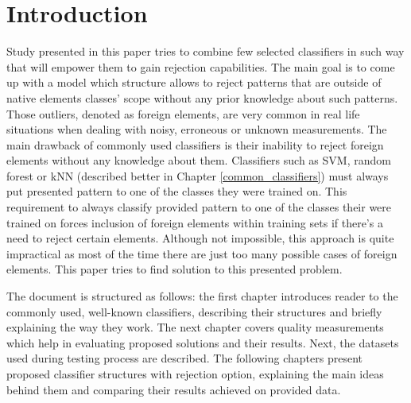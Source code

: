 \chapter{Introduction}

Study presented in this paper tries to combine few selected classifiers in such way that will empower them to gain rejection capabilities. The main goal is to come up with a model which structure allows to reject patterns that are outside of native elements classes' scope without any prior knowledge about such patterns. Those outliers, denoted as foreign elements, are very common in real life situations when dealing with noisy, erroneous or unknown measurements. The main drawback of commonly used classifiers is their inability to reject foreign elements without any knowledge about them. Classifiers such as SVM, random forest or kNN (described better in Chapter \ref{common_classifiers}) must always put presented pattern to one of the classes they were trained on. This  requirement to always classify provided pattern to one of the classes their were trained on forces inclusion of foreign elements within training sets if there's a need to reject certain elements. Although not impossible, this approach is quite impractical as most of the time there are just too many possible cases of foreign elements. This paper tries to find solution to this presented problem.

The document is structured as follows: the first chapter introduces reader to the commonly used, well-known classifiers, describing their structures and briefly explaining the way they work. The next chapter covers quality measurements which help in evaluating proposed solutions and their results. Next, the datasets used during testing process are described. The following chapters present proposed classifier structures with rejection option, explaining the main ideas behind them and comparing their results achieved on provided data. 

